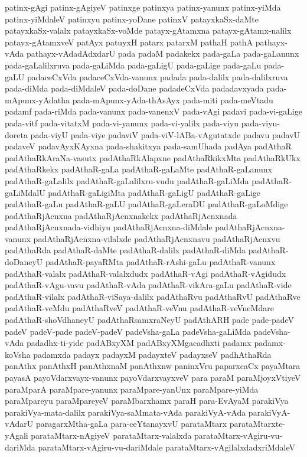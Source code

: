 {patinx-gAgi
patinx-gAgiyeV
patinxge
patinxya
patinx-yanunx
patinx-yiMda
patinx-yiMdaleV
patinxyu
patinx-yoDane
patinxV
patayxkaSx-daMte
patayxkaSx-valalx
patayxkaSx-voMde
patayx-gAtamxna
patayx-gAtamx-nalilx
patayx-gAtamxveV
patAyx
patuyxH
patarx
patarxM
pathaH
pathA
pathayx-vAda
pathayx-vAdadAdxdarU
pada
padaM
padakekx
pada-gaLa
pada-gaLanunx
pada-gaLalilxruva
pada-gaLiMda
pada-gaLigU
pada-gaLige
pada-gaLu
pada-gaLU
padaceCxVda
padaceCxVda-vanunx
padada
pada-dalilx
pada-dalilxruva
pada-diMda
pada-diMdaleV
pada-doDane
padadeCxVda
padadavxyada
pada-mApunx-yAdatha
pada-mApunx-yAda-thAsAyx
pada-miti
pada-meVtadu
padamf
pada-riMda
pada-vanunx
pada-vanenxV
pada-vAgi
padavi
pada-vi-gaLige
pada-vitf
pada-vitatxM
pada-vi-yanunx
pada-vi-yalilx
pada-viyu
pada-viyu-doreta
pada-viyU
pada-viye
padaviV
pada-viV-lABa-vAgutatxde
padavu
padavU
padaveV
padavAyxKAyxna
pada-shakitxya
pada-samUhada
padAya
padAthaR
padAthaRkAraNa-vasutx
padAthaRkAlapxne
padAthaRkikxMta
padAthaRkUkx
padAthaRkekx
padAthaR-gaLa
padAthaR-gaLaMte
padAthaR-gaLanunx
padAthaR-gaLalilx
padAthaR-gaLalilxru-vudu
padAthaR-gaLiMda
padAthaR-gaLiMdalU
padAthaR-gaLigiMta
padAthaR-gaLigU
padAthaR-gaLige
padAthaR-gaLu
padAthaR-gaLU
padAthaR-gaLeraDU
padAthaR-gaLoMdige
padAthaRjAcnxna
padAthaRjAcnxnakekx
padAthaRjAcnxnada
padAthaRjAcnxnada-vidhiyu
padAthaRjAcnxna-diMdale
padAthaRjAcnxna-vanunx
padAthaRjAcnxna-vilalxde
padAthaRjAcnxnavu
padAthaRjAcnxvu
padAthaRda
padAthaR-daMte
padAthaR-dalilx
padAthaR-diMda
padAthaR-doDaneyU
padAthaR-payaRMta
padAthaR-rAshi-gaLu
padAthaR-vanunx
padAthaR-valalx
padAthaR-valalxdudx
padAthaR-vAgi
padAthaR-vAgidudx
padAthaR-vAgu-vavu
padAthaR-vAda
padAthaR-vikAra-gaLu
padAthaR-vide
padAthaR-vilalx
padAthaR-viSaya-dalilx
padAthaRvu
padAthaRvU
padAthaRve
padAthaR-veMdu
padAthaRveV
padAthaR-veVnu
padAthaR-veVneMdare
padAthaR-shoVdhaneyU
padAthaRsamxraNeyU
padAthARH
pade
pade-padeV
padeV
padeV-pade
padeV-padeV
padeVsha-gaLa
padeVsha-gaLiMda
padeVsha-vAda
padadhx-ti-yide
padABxyXM
padABxyXMgacadhxti
padamx
padamx-koVsha
padamxda
padayx
padayxM
padayxteV
padayxseV
padhAthaRda
panAthx
panAthxH
panAthxnaM
panAthxnw
paninxVru
paparxcaCx
payaMtara
payasA
payoVdarxvayx-vanunx
payoVdarxvayxveV
para
paraM
paraMjoyxVtiyeV
paraMparA
paraMpare-yanunx
paraMpare-yanUnx
paraMpare-yiMda
paraMpareyu
paraMpareyeV
paraMbarxhamx
paraH
para-EvAyaM
parakiVya
parakiVya-mata-dalilx
parakiVya-saMmata-vAda
parakiVyA-vAda
parakiVyA-vAdarU
paragarxMtha-gaLa
para-ceYtanayxvU
parataMtarx
parataMtarxte-yAgali
parataMtarx-nAgiyeV
parataMtarx-valalxda
parataMtarx-vAgiru-vu-dariMda
parataMtarx-vAgiru-vu-dariMdale
parataMtarx-vAgilalxdadxriMdaleV
}
